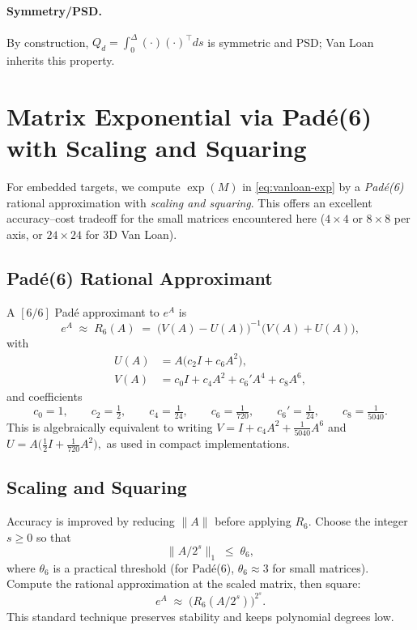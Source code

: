 \documentclass[11pt]{article}
\begin{document}
\paragraph{Symmetry/PSD.} By construction, $Q_d= \int_0^\Delta (\cdot)(\cdot)^\top ds$ is symmetric and PSD; Van Loan inherits this property.
\vspace{1ex}

\section{Matrix Exponential via Pad\'e(6) with Scaling and Squaring}
\label{sec:pade6}

For embedded targets, we compute $\exp(M)$ in \eqref{eq:vanloan-exp} by a \emph{Pad\'e(6)} rational approximation
with \emph{scaling and squaring}. This offers an excellent accuracy--cost tradeoff for the
small matrices encountered here ($4\times 4$ or $8\times 8$ per axis, or $24\times 24$ for 3D Van Loan).

\subsection{Pad\'e(6) Rational Approximant}
A $[6/6]$ Pad\'e approximant to $e^A$ is
\begin{equation}
e^A \;\approx\; R_6(A) \;=\; \big(V(A)-U(A)\big)^{-1}\big(V(A)+U(A)\big),
\label{eq:pade-rational}
\end{equation}
with
\begin{align}
U(A) &= A\Big(c_2 I + c_6 A^2\Big), 
\label{eq:U-def}\\
V(A) &= c_0 I + c_4 A^2 + c_6' A^4 + c_8 A^6,
\label{eq:V-def}
\end{align}
and coefficients
\begin{equation}
c_0 = 1,\qquad c_2 = \tfrac{1}{2},\qquad c_4 = \tfrac{1}{24},\qquad
c_6 = \tfrac{1}{720},\qquad c_6'=\tfrac{1}{24},\qquad c_8 = \tfrac{1}{5040}.
\label{eq:pade-coeffs}
\end{equation}
This is algebraically equivalent to writing
\(
V= I + c_4 A^2 + \tfrac{1}{5040}A^6
\)
and
\(
U= A\big(\tfrac12 I + \tfrac{1}{720}A^2\big),
\)
as used in compact implementations.

\subsection{Scaling and Squaring}
Accuracy is improved by reducing $\|A\|$ before applying $R_6$. Choose the integer $s\ge 0$ so that
\begin{equation}
\|A/2^s\|_1 \;\le\; \theta_6,
\label{eq:theta-choice}
\end{equation}
where $\theta_6$ is a practical threshold (for Pad\'e(6), $\theta_6 \approx 3$ for small matrices).
Compute the rational approximation at the scaled matrix, then square:
\begin{equation}
e^A \;\approx\; \Big(R_6(A/2^s)\Big)^{2^s}.
\label{eq:scale-square}
\end{equation}
This standard technique preserves stability and keeps polynomial degrees low.
\end{document}
